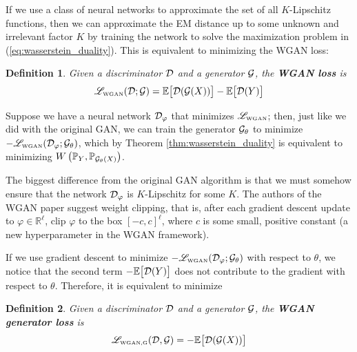 \documentclass{article}
\newcommand{\R}{\mathbb{R}}
\newtheorem{defn}{Definition}
\begin{document}
	If we use a class of neural networks to approximate the set of all \(K\)-Lipschitz functions, then we can approximate the EM distance up to some unknown and irrelevant factor \(K\) by training the network to solve the maximization problem in (\ref{eq:wasserstein_duality}). This is equivalent to minimizing the WGAN loss:
	\newcommand{\losswgan}{\mathscr{L}_{\textnormal{\tiny WGAN}}}
	\begin{defn}\label{def:wgan_loss}
		Given a discriminator \(\mathcal{D}\) and a generator \(\mathcal{G}\), the \textbf{WGAN loss} is
		\begin{equation}\label{eq:wgan_loss}
			\losswgan(\discriminator; \generator) = \expect\big[\discriminator(\generator(X))\big] - \expect\big[\discriminator(Y)\big]
		\end{equation}
	\end{defn}
	Suppose we have a neural network \(\mathcal{D}_\varphi\) that minimizes \(\losswgan\); then, just like we did with the original GAN, we can train the generator \(\mathcal{G}_{\theta}\) to minimize \(-\losswgan(\discriminator_\varphi; \generator_{\theta})\), which by Theorem \ref{thm:wasserstein_duality} is equivalent to minimizing \(W\left(\mathbb{P}_Y, \mathbb{P}_{\mathcal{G}_{\theta}(X)}\right)\).
	
	The biggest difference from the original GAN algorithm is that we must somehow ensure that the network \(\mathcal{D}_\varphi\) is \(K\)-Lipschitz for some \(K\). The authors of the WGAN paper suggest weight clipping, that is, after each gradient descent update to \(\varphi \in \R^\ell\), clip \(\varphi\) to the box \([-c,c]^{\ell}\), where \(c\) is some small, positive constant (a new hyperparameter in the WGAN framework).
	
	If we use gradient descent to minimize \(-\losswgan(\discriminator_\varphi; \generator_\theta)\) with respect to \(\theta\), we notice that the second term \(- \mathbb{E}\big[\mathcal{D}(Y)\big]\) does not contribute to the gradient with respect to \(\theta\). Therefore, it is equivalent to minimize
	\newcommand{\losswgangenerator}{\mathscr{L}_{\textnormal{\tiny WGAN,G}}}
	\begin{defn}\label{def:wgan_generator_loss}
		Given a discriminator \(\mathcal{D}\) and a generator \(\mathcal{G}\), the \textbf{WGAN generator loss} is
		\begin{equation}\label{eq:wgan_generator_loss}
			\losswgangenerator(\discriminator, \generator) = -\expect\big[\discriminator(\generator(X))\big]
		\end{equation}
	\end{defn}
	
\end{document}
